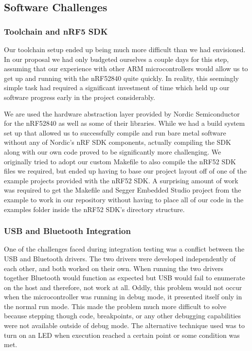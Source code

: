 \subsection{Software Challenges}

\subsubsection{Toolchain and nRF5 SDK}

Our toolchain setup ended up being much more difficult than we had envisioned.
In our proposal we had only budgeted ourselves a couple days for this step,
assuming that our experience with other ARM microcontrollers would allow us to
get up and running with the nRF52840 quite quickly. In reality, this seemingly
simple task had required a significant investment of time which held up our
software progress early in the project considerably.

We are used the hardware abstraction layer provided by Nordic
Semiconductor for the nRF52840 as well as some of their libraries. While we had
a build system set up that allowed us to successfully compile and run bare metal
software without any of Nordic's nRF SDK components, actually compiling the SDK 
along with our own code proved to be significantly more challenging. We 
originally tried to adopt our custom Makefile to also compile the nRF52 SDK files 
we required, but ended up having to base our project layout off of one of the 
example projects provided with the nRF52 SDK. A surprising amount of work was 
required to get the Makefile and Segger Embedded Studio project from the example 
to work in our repository without having to place all of our code in the examples 
folder inside the nRF52 SDK's directory structure.

\subsubsection{USB and Bluetooth Integration}

One of the challenges faced during integration testing was a conflict between 
the USB and Bluetooth drivers. The two drivers were developed independently of
each other, and both worked on their own. When running the two drivers together
Bluetooth would function as expected but USB would fail to enumerate on the host
and therefore, not work at all. Oddly, this problem would not occur when the 
microcontroller was running in debug mode, it presented itself only in the 
normal run mode. This made the problem much more difficult to solve because
stepping though code, breakpoints, or any other debugging capabilities were not
available outside of debug mode. The alternative technique used was to turn on 
an LED when execution reached a certain point or some condition was met. 

